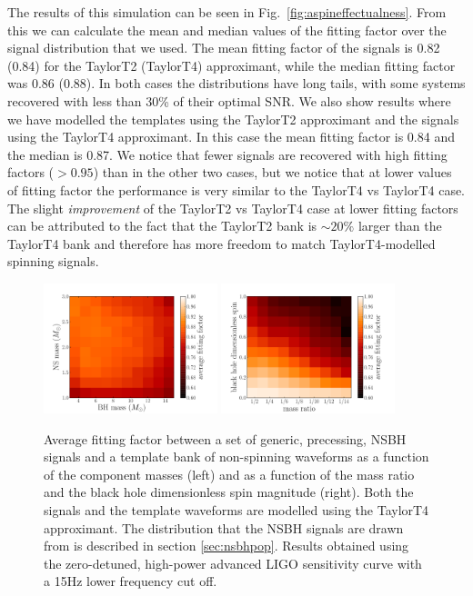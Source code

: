 The results of this simulation can be seen in 
Fig.~\ref{fig:aspineffectualness}. From this we can calculate the mean and 
median values of the fitting factor over the signal distribution that we used.
The mean fitting factor of the
signals is 0.82 (0.84) for the TaylorT2 (TaylorT4) approximant, while the median
fitting factor was 0.86 (0.88). In both cases the distributions have 
long tails, with some systems recovered with less than 30\% of their optimal
\ac{SNR}.
We also show results where we have modelled the templates using the TaylorT2
approximant and the signals using the TaylorT4 approximant. In this case
the mean fitting factor is 0.84 and the median is 0.87.
We notice that fewer signals are recovered with
high fitting factors ($> 0.95$) than in the other two cases, but we notice that
at lower values of fitting
factor the performance is very similar to the TaylorT4 vs TaylorT4 case.
The slight \emph{improvement}
of the TaylorT2 vs TaylorT4 case at lower fitting factors can be attributed to
the fact that the TaylorT2 bank is $\sim20\%$
larger than the TaylorT4 bank and therefore has more freedom to match
TaylorT4-modelled spinning signals. 

\begin{figure}
    \centering
    \begin{minipage}[l]{\columnwidth}
    \centering
\includegraphics[width=0.45\textwidth]
{papers/nsbh_effectualness/figure8A.pdf}
\includegraphics[width=0.45\textwidth]
{papers/nsbh_effectualness/figure8B.pdf}
\caption{\label{fig:nonspinavFF}
Average fitting factor between a set of generic, precessing, NSBH signals and a
template bank of non-spinning waveforms as a function of the component masses
(left) and as a function of the mass ratio and the black hole dimensionless spin
magnitude (right). Both the signals and the template waveforms are modelled
using the TaylorT4 approximant. The distribution that the NSBH
signals are drawn from is described in section \ref{sec:nsbhpop}.
Results obtained
using the zero-detuned, high-power advanced LIGO sensitivity curve with a 15Hz
lower frequency cut off.
}
\end{minipage}
\end{figure}

